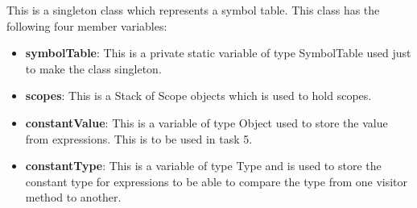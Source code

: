 \documentclass{article}
\begin{document}
			This is a singleton class which represents a symbol table. This class has the following four member variables:
			\begin{itemize}
			\item \textbf{symbolTable}: This is a private static variable of type SymbolTable used just to make the class singleton.
			\item \textbf{scopes}: This is a Stack of Scope objects which is used to hold scopes.
			\item \textbf{constantValue}: This is a variable of type Object used to store the value from expressions. This is to be used in task 5.
			\item \textbf{constantType}: This is a variable of type Type and is used to store the constant type for expressions to be able to compare the type from one visitor method to another.
			
			\end{itemize}
			
\end{document}
